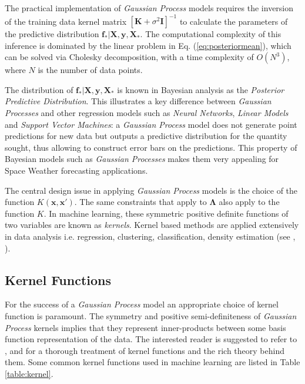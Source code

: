 \documentclass[sw, draft]{AGUTeX}
\begin{document}
\begin{article}
The practical implementation of \emph{Gaussian Process} models requires the inversion of the training data kernel matrix $[\mathbf{K} + \sigma^{2} \mathbf{I}]^{-1}$ to calculate the parameters of the predictive distribution $\mathbf{f_*}|\mathbf{X},\mathbf{y},\mathbf{X_*}$. The computational complexity of this inference is dominated by the linear problem in Eq. (\ref{eq:posteriormean}), which can be solved via Cholesky decomposition, with a time complexity of $O(N^3)$, where $N$ is the number of data points.

The distribution of $\mathbf{f_*}| \mathbf{X},\mathbf{y},\mathbf{X_*}$ is known in Bayesian analysis as the \emph{Posterior Predictive Distribution}. This illustrates a key difference between \emph{Gaussian Processes} and other regression models such as \emph{Neural Networks}, \emph{Linear Models} and \emph{Support Vector Machines}: a \emph{Gaussian Process} model does not generate point predictions for new data but outputs a predictive distribution for the quantity sought, thus allowing to construct error bars on the predictions. This property of Bayesian models such as \emph{Gaussian Processes} makes them very appealing for Space Weather forecasting applications. 

The central design issue in applying \emph{Gaussian Process} models is the choice of the function $K(\mathbf{x}, \mathbf{x}')$. The same constraints that apply to $\mathbf{\Lambda}$ also apply to the function $K$. In machine learning, these symmetric positive definite functions of two variables are known as \emph{kernels}. Kernel based methods are applied extensively in data analysis i.e. regression, clustering, classification, density estimation (see \citet{Scholkopf:2001:LKS:559923}, \citet{hofmann2008}).

\subsection{Kernel Functions}

For the success of a \emph{Gaussian Process} model an appropriate choice of kernel function is paramount. The symmetry and positive semi-definiteness of \emph{Gaussian Process} kernels implies that they represent inner-products between some basis function representation of the data. The interested reader is suggested to refer to \citet{Berlinet2004}, \citet{Scholkopf:2001:LKS:559923} and \citet{hofmann2008} for a thorough treatment of kernel functions and the rich theory behind them. Some common kernel functions used in machine learning are listed in Table \ref{table:kernel}. 


\end{article}
\end{document}
